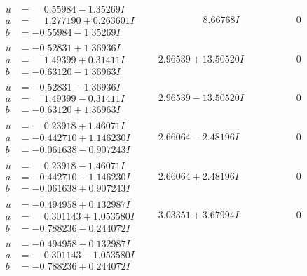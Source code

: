 \documentclass[1p]{elsarticle_modified}
\theoremstyle{definition}
\begin{document}
$$\begin{array}{c|c|c}
\begin{aligned}
u &= \phantom{-}0.55984 - 1.35269 I \\
a &= \phantom{-}1.277190 + 0.263601 I \\
b &= -0.55984 - 1.35269 I\end{aligned}
 & \phantom{-0.000000 -}8.66768 I & \phantom{-0.000000 } 0 \\ \hline\begin{aligned}
u &= -0.52831 + 1.36936 I \\
a &= \phantom{-}1.49399 + 0.31411 I \\
b &= -0.63120 - 1.36963 I\end{aligned}
 & \phantom{-}2.96539 + 13.50520 I & \phantom{-0.000000 } 0 \\ \hline\begin{aligned}
u &= -0.52831 - 1.36936 I \\
a &= \phantom{-}1.49399 - 0.31411 I \\
b &= -0.63120 + 1.36963 I\end{aligned}
 & \phantom{-}2.96539 - 13.50520 I & \phantom{-0.000000 } 0 \\ \hline\begin{aligned}
u &= \phantom{-}0.23918 + 1.46071 I \\
a &= -0.442710 + 1.146230 I \\
b &= -0.061638 - 0.907243 I\end{aligned}
 & \phantom{-}2.66064 - 2.48196 I & \phantom{-0.000000 } 0 \\ \hline\begin{aligned}
u &= \phantom{-}0.23918 - 1.46071 I \\
a &= -0.442710 - 1.146230 I \\
b &= -0.061638 + 0.907243 I\end{aligned}
 & \phantom{-}2.66064 + 2.48196 I & \phantom{-0.000000 } 0 \\ \hline\begin{aligned}
u &= -0.494958 + 0.132987 I \\
a &= \phantom{-}0.301143 + 1.053580 I \\
b &= -0.788236 - 0.244072 I\end{aligned}
 & \phantom{-}3.03351 + 3.67994 I & \phantom{-0.000000 } 0 \\ \hline\begin{aligned}
u &= -0.494958 - 0.132987 I \\
a &= \phantom{-}0.301143 - 1.053580 I \\
b &= -0.788236 + 0.244072 I\end{aligned}

\end{array}$$
\end{document}
